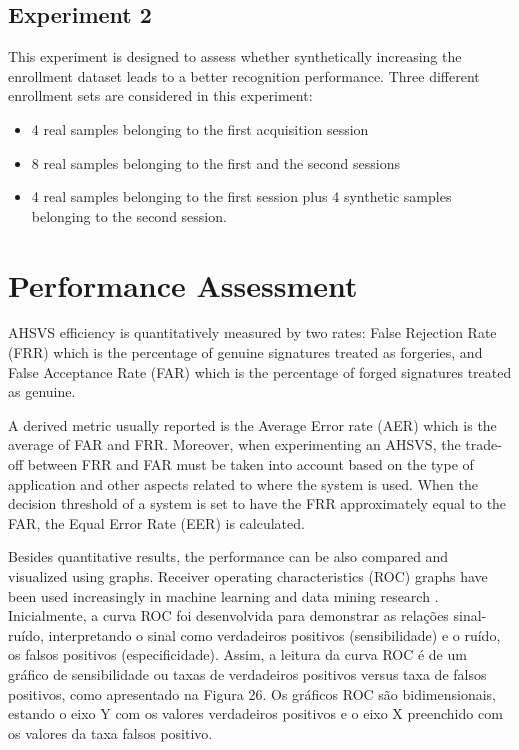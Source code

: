 \subsection{Experiment 2}

This experiment is designed to assess whether synthetically increasing the enrollment dataset leads to a better recognition performance. Three different enrollment sets are considered in this experiment: 
\begin{itemize}
  \item 4 real samples belonging to the
  first acquisition session
  \item 8 real samples belonging to the first and
  the second sessions
  \item 4 real samples belonging
  to the first session plus 4 synthetic samples belonging
  to the second session.
\end{itemize}

\section{Performance Assessment}

AHSVS efficiency is quantitatively measured by two rates: False Rejection Rate (FRR) which is the percentage of genuine signatures treated as forgeries, and False
Acceptance Rate (FAR) which is the percentage of forged signatures treated as
genuine. 

A derived metric usually reported is the Average Error rate (AER) which is the average of FAR and FRR. Moreover, when experimenting an AHSVS, the trade-off between FRR and FAR must be taken into account based on the type of application and other aspects related to where the system is used. When the decision threshold of a system is set to have the FRR approximately equal to the FAR, the Equal Error Rate (EER) is calculated.

Besides quantitative results, the performance can be also compared and visualized using graphs. Receiver operating characteristics (ROC) graphs have been used increasingly in machine learning and data mining research \cite{fawcett2006introduction}. Inicialmente, a curva ROC foi desenvolvida para demonstrar as relações sinal-ruído,
interpretando o sinal como verdadeiros positivos (sensibilidade) e o ruído, os falsos positivos
(especificidade). Assim, a leitura da curva ROC é de um gráfico de sensibilidade ou taxas de
verdadeiros positivos versus taxa de falsos positivos, como apresentado na Figura 26. Os
gráficos ROC são bidimensionais, estando o eixo Y com os valores verdadeiros positivos e o
eixo X preenchido com os valores da taxa falsos positivo.


